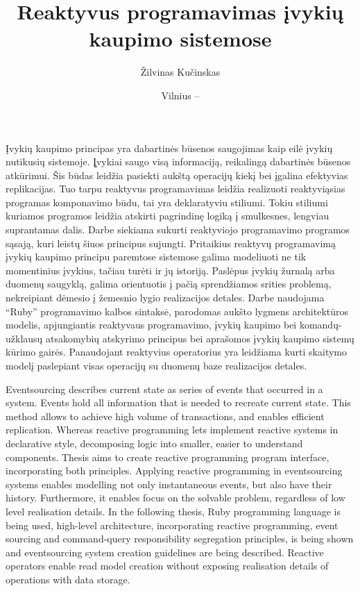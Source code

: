 \documentclass{VUMIFPSmagistrinis}
\title{Reaktyvus programavimas įvykių kaupimo sistemose}
\author{Žilvinas Kučinskas}
\date{Vilnius – \the\year}
\begin{document}
\maketitle



Įvykių kaupimo principas yra dabartinės būsenos saugojimas kaip eilė įvykių nutikusių sistemoje. Į̨vykiai saugo visą informaciją, reikalingą dabartinės būsenos atkūrimui. Šis būdas leidžia pasiekti aukštą operacijų kiekį bei įgalina efektyvias replikacijas. Tuo tarpu reaktyvus programavimas leidžia realizuoti reaktyviąsias programas komponavimo būdu, tai yra deklaratyviu stiliumi. Tokiu stiliumi kuriamos programos leidžia atskirti pagrindinę logiką į smulkesnes, lengviau suprantamas dalis. Darbe siekiama sukurti reaktyviojo programavimo programos sąsają, kuri leistų šiuos principus sujungti. Pritaikius reaktyvų programavimą įvykių kaupimo principu paremtose sistemose galima modeliuoti ne tik momentinius įvykius, tačiau turėti ir jų istoriją. Paslėpus įvykių žurnalą arba duomenų saugyklą, galima orientuotis į pačią sprendžiamos srities problemą, nekreipiant dėmesio į žemesnio lygio realizacijos detales. Darbe naudojama ``Ruby'' programavimo kalbos sintaksė, parodomas aukšto lygmens architektūros modelis, apjungiantis reaktyvaus programavimo, įvykių kaupimo bei komandų-užklausų atsakomybių atskyrimo principus bei aprašomos įvykių kaupimo sistemų kūrimo gairės. Panaudojant reaktyvius operatorius yra leidžiama kurti skaitymo modelį paslepiant visas operacijų su duomenų baze realizacijos detales.



Eventsourcing describes current state as series of events that occurred in a system. Events hold all information that is needed to recreate current state. This method allows to achieve high volume of transactions, and enables efficient replication. Whereas reactive programming lets implement reactive systems in declarative style, decomposing logic into smaller, easier to understand components. Thesis aims to create reactive programming program interface, incorporating both principles. Applying reactive programming in eventsourcing systems enables modelling  not only instantaneous events, but also have their history. Furthermore, it enables focus on the solvable problem, regardless of low level realisation details. In the following thesis, Ruby programming language is being used, high-level architecture, incorporating reactive programming, event sourcing and command-query responsibility segregation principles, is being shown and eventsourcing system creation guidelines are being described. Reactive operators enable read model creation without exposing realisation details of operations with data storage.
\end{document}
